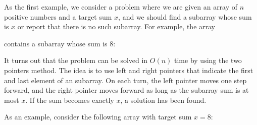 As the first example,
we consider a problem where we are
given an array of $n$ positive numbers
and a target sum $x$,
and we should find a subarray whose sum is $x$
or report that there is no such subarray.
For example, the array
\begin{center}
\end{center}
contains a subarray whose sum is 8:
\begin{center}
\end{center}

It turns out that the problem can be solved in
$O(n)$ time by using the two pointers method.
The idea is to use
left and right pointers that indicate the
first and last element of an subarray.
On each turn, the left pointer moves one step
forward, and the right pointer moves forward
as long as the subarray sum is at most $x$.
If the sum becomes exactly $x$,
a solution has been found.

As an example, consider the following array
with target sum $x=8$:
\begin{center}
\end{center}

